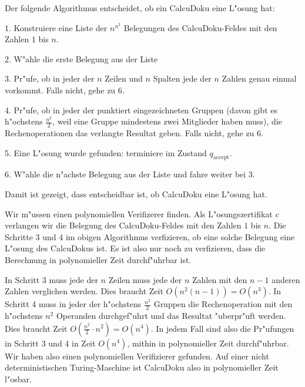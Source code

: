 \begin{loesung}
\begin{teilaufgaben}
\item
Der folgende Algorithmus entscheidet, ob ein CalcuDoku eine L"osung
hat:
\begin{compactenum}
\item[1.] Konstruiere eine Liste der $n^{n^2}$ Belegungen des CalcuDoku-Feldes
mit den Zahlen $1$ bis $n$.
\item[2.] W"ahle die erste Belegung aus der Liste
\item[3.] Pr"ufe, ob in jeder der $n$ Zeilen und $n$ Spalten jede der
$n$ Zahlen genau einmal vorkommt. Falls nicht, gehe zu 6.
\item[4.] Pr"ufe, ob in jeder der punktiert eingezeichneten Gruppen
(davon gibt es h"ochstens $\frac{n^2}2$, weil eine Gruppe mindestens
zwei Mitglieder haben muss), die Rechenoperationen das verlangte Resultat
geben. Falls nicht, gehe zu 6.
\item[5.]
Eine L"osung wurde gefunden: terminiere im Zustand $q_{\text{accept}}$.
\item[6.]
W"ahle die n"achste Belegung aus der Liste und fahre weiter bei 3.
\end{compactenum}
Damit ist gezeigt, dass entscheidbar ist, ob CalcuDoku eine L"osung
hat.
\item
Wir m"ussen einen polynomiellen Verifizerer finden. Als L"osungszertifikat
$c$ verlangen wir die Belegung des CalcuDoku-Feldes mit den Zahlen
$1$ bis $n$.
Die Schritte 3 und 4 im obigen Algorithmus verfizieren, ob eine solche
Belegung eine L"osung des CalcuDokus ist. Es ist also nur noch zu verfizieren,
dass die Berechnung in polynomieller Zeit durchf"uhrbar ist.

In Schritt 3 muss jede der $n$ Zeilen muss jede der $n$ Zahlen mit den
$n-1$ anderen Zahlen verglichen werden. Dies braucht Zeit $O(n^2(n-1))=O(n^3)$.
In Schritt 4 muss in jeder der h"ochstens $\frac{n^2}2$ Gruppen die 
Rechenoperation mit den h"ochstens $n^2$ Operanden durchgef"uhrt und das
Resultat "uberpr"uft werden. Dies braucht Zeit $O(\frac{n^2}2\cdot n^2)=O(n^4)$.
In jedem Fall sind also die Pr"ufungen in Schritt 3 und 4 in Zeit $O(n^4)$,
mithin in polynomieller Zeit durchf"uhrbar. Wir haben also einen polynomiellen
Verifizierer gefunden.
Auf einer nicht deterministischen Turing-Maschine ist CalcuDoku also
in polynomieller Zeit l"osbar.
\end{teilaufgaben}
\end{loesung}
